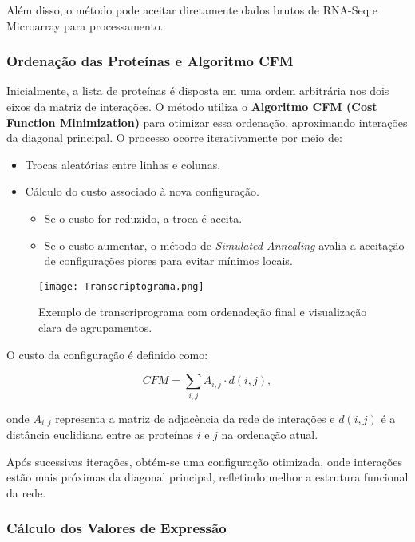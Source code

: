 \documentclass[12pt]{article}
\begin{document}
Além disso, o método pode aceitar diretamente dados brutos de RNA-Seq e Microarray para processamento.

\subsubsection{Ordenação das Proteínas e Algoritmo CFM}

Inicialmente, a lista de proteínas é disposta em uma ordem arbitrária nos dois eixos da matriz de interações. O método utiliza o \textbf{Algoritmo CFM (Cost Function Minimization)} para otimizar essa ordenação, aproximando interações da diagonal principal. O processo ocorre iterativamente por meio de:


\begin{itemize}
    \item Trocas aleatórias entre linhas e colunas.
    \item Cálculo do custo associado à nova configuração.
    \begin{itemize}
        \item Se o custo for reduzido, a troca é aceita.
        \item Se o custo aumentar, o método de \textit{Simulated Annealing} avalia a aceitação de configurações piores para evitar mínimos locais.
    \end{itemize}
\end{itemize}

\begin{figure}
    \centering
    \texttt{[image: Transcriptograma.png]}
    \caption{Exemplo de transcriprograma com ordenadeção final e visualização clara de agrupamentos. \cite{deAlmeida2020}}
    \label{fig:enter-label}
\end{figure}

O custo da configuração é definido como:

\begin{equation}
    CFM = \sum_{i,j} A_{i,j} \cdot d(i,j),
\end{equation}

onde $A_{i,j}$ representa a matriz de adjacência da rede de interações e $d(i,j)$ é a distância euclidiana entre as proteínas $i$ e $j$ na ordenação atual.

Após sucessivas iterações, obtém-se uma configuração otimizada, onde interações estão mais próximas da diagonal principal, refletindo melhor a estrutura funcional da rede.

\subsubsection{Cálculo dos Valores de Expressão}
\end{document}
